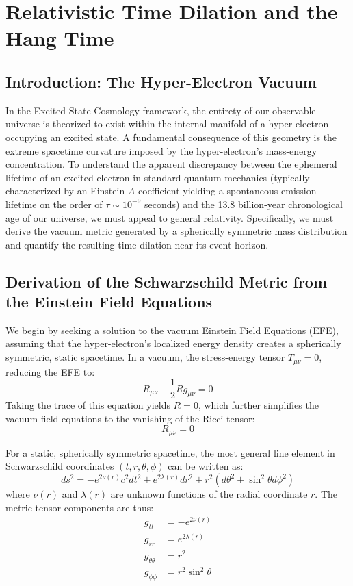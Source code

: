 \section{Relativistic Time Dilation and the Hang Time}
\label{ch:time_dilation}

\subsection{Introduction: The Hyper-Electron Vacuum}

In the Excited-State Cosmology framework, the entirety of our observable universe is theorized to exist within the internal manifold of a hyper-electron occupying an excited state. A fundamental consequence of this geometry is the extreme spacetime curvature imposed by the hyper-electron's mass-energy concentration. To understand the apparent discrepancy between the ephemeral lifetime of an excited electron in standard quantum mechanics (typically characterized by an Einstein $A$-coefficient yielding a spontaneous emission lifetime on the order of $\tau \sim 10^{-9}$ seconds) and the 13.8 billion-year chronological age of our universe, we must appeal to general relativity. Specifically, we must derive the vacuum metric generated by a spherically symmetric mass distribution and quantify the resulting time dilation near its event horizon. \cite{Liddle1992, Aspect1982, Perlmutter1999}

\subsection{Derivation of the Schwarzschild Metric from the Einstein Field Equations~\cite{Einstein1916GR}}

We begin by seeking a solution to the vacuum Einstein Field Equations (EFE), assuming that the hyper-electron's localized energy density creates a spherically symmetric, static spacetime. In a vacuum, the stress-energy tensor $T_{\mu\nu} = 0$, reducing the EFE to:
\begin{equation}
R_{\mu\nu} - \frac{1}{2}R g_{\mu\nu} = 0
\end{equation}
Taking the trace of this equation yields $R = 0$, which further simplifies the vacuum field equations to the vanishing of the Ricci tensor:
\begin{equation}
R_{\mu\nu} = 0
\end{equation}

For a static, spherically symmetric spacetime, the most general line element in Schwarzschild coordinates $(t, r, \theta, \phi)$ can be written as:
\begin{equation}
ds^2 = -e^{2\nu(r)} c^2 dt^2 + e^{2\lambda(r)} dr^2 + r^2(d\theta^2 + \sin^2\theta d\phi^2)
\end{equation}
where $\nu(r)$ and $\lambda(r)$ are unknown functions of the radial coordinate $r$. The metric tensor components are thus:
\begin{align}
g_{tt} &= -e^{2\nu(r)} \\
g_{rr} &= e^{2\lambda(r)} \\
g_{\theta\theta} &= r^2 \\
g_{\phi\phi} &= r^2 \sin^2\theta
\end{align}


